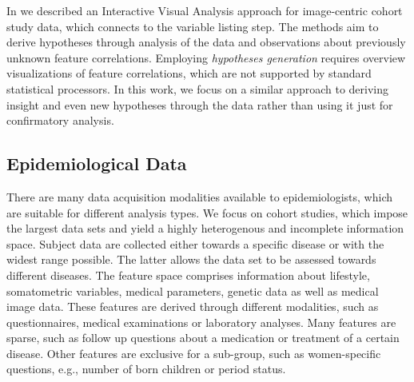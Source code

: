 \documentclass[journal]{style/vgtc} 			          %
\newcommand{\com}[1]{\textcolor{orange}{\uline{#1}}}
\begin{document}
In \cite{Klemm2014VIS} we described an Interactive Visual Analysis approach for image-centric cohort study data, which connects to the variable listing step.
The methods aim to derive hypotheses through analysis of the data and observations about previously unknown feature correlations.
Employing \emph{hypotheses generation} requires overview visualizations of feature correlations, which are not supported by standard statistical processors.
In this work, we focus on a similar approach to deriving insight and even new hypotheses through the data rather than using it just for confirmatory analysis.

\subsection{Epidemiological Data} \label{sec:EpidemiologicalData}
There are many data acquisition modalities available to epidemiologists, which are suitable for different analysis types.
We focus on cohort studies, which impose the largest data sets and yield a highly heterogenous and incomplete information space.
Subject data are collected either towards a specific disease or with the widest range possible.
The latter allows the data set to be assessed towards different diseases.
The feature space comprises information about lifestyle, somatometric variables, medical parameters, genetic data as well as medical image data.
These features are derived through different modalities, such as questionnaires, medical examinations or laboratory analyses.
Many features are sparse, such as follow up questions about a medication or treatment of a certain disease.
Other features are exclusive for a sub-group, such as women-specific questions, e.g., number of born children or period status.
\end{document}
